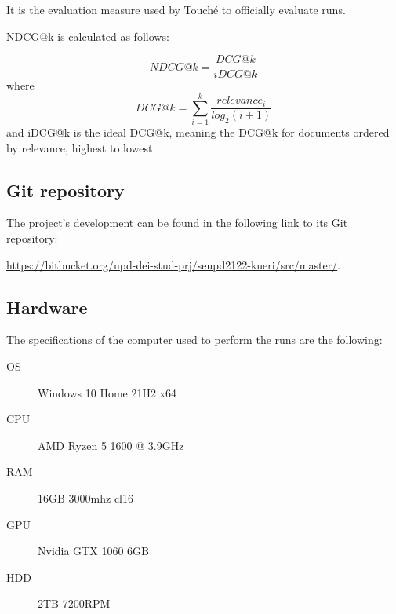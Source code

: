 	It is the evaluation measure used by Touché to officially evaluate runs.

	NDCG@k is calculated as follows:

	$$
	NDCG@k = \frac{DCG@k}{iDCG@k}
	$$
	where
	$$
	DCG@k = \sum_{i=1}^{k}\frac{relevance_i}{log_2(i+1)}
	$$
	and iDCG@k is the ideal DCG@k, meaning the DCG@k for documents ordered by relevance, highest to lowest.


\subsection{Git repository}

	The project’s development can be found in the following link to its Git repository:
	
	\url{https://bitbucket.org/upd-dei-stud-prj/seupd2122-kueri/src/master/}.
	

\subsection{Hardware}

	The specifications of the computer used to perform the runs are the following:
	\begin{description}
		\item[OS] Windows 10 Home 21H2 x64
		\item[CPU] AMD Ryzen 5 1600 @ 3.9GHz
		\item[RAM] 16GB 3000mhz cl16
		\item[GPU] Nvidia GTX 1060 6GB
		\item[HDD] 2TB 7200RPM
	\end{description}